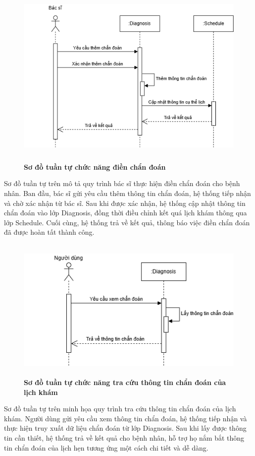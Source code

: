 \begin{figure}[H]
	\centering
	\includegraphics[width=11.5cm,height=9cm]{Images/sequence/diagnosis/create.drawio.png}
	\caption[Sơ đồ tuần tự chức năng điền chẩn đoán]{\bfseries \fontsize{12pt}{0pt}
		\selectfont Sơ đồ tuần tự chức năng điền chẩn đoán}
	\label{sequence_create_diag} %
\end{figure}
Sơ đồ tuần tự trên mô tả quy trình bác sĩ thực hiện điền chẩn đoán cho bệnh nhân. Ban đầu, bác sĩ gửi yêu cầu thêm thông tin chẩn đoán, hệ thống tiếp nhận và chờ xác nhận từ bác sĩ.
Sau khi được xác nhận, hệ thống cập nhật thông tin chẩn đoán vào lớp Diagnosis, đồng thời điều chỉnh kết quá lịch khám thông qua lớp Schedule.
Cuối cùng, hệ thống trả về kết quả, thông báo việc điền chẩn đoán đã được hoàn tất thành công.

\begin{figure}[H]
	\centering
	\includegraphics[width=11.5cm,height=7cm]{Images/sequence/diagnosis/getByScheduleId.drawio.png}
	\caption[Sơ đồ tuần tự chức năng tra cứu thông tin chẩn đoán của lịch khám]{\bfseries \fontsize{12pt}{0pt}
		\selectfont Sơ đồ tuần tự chức năng tra cứu thông tin chẩn đoán của lịch khám}
	\label{sequence_get} %
\end{figure}
Sơ đồ tuần tự trên minh họa quy trình tra cứu thông tin chẩn đoán của lịch khám. Người dùng gửi yêu cầu xem thông tin chẩn đoán, hệ thống tiếp nhận và thực hiện truy xuất dữ liệu chẩn đoán từ lớp Diagnosis.
Sau khi lấy được thông tin cần thiết, hệ thống trả về kết quả cho bệnh nhân, hỗ trợ họ nắm bắt thông tin chẩn đoán của lịch hẹn tương ứng một cách chi tiết và dễ dàng.

